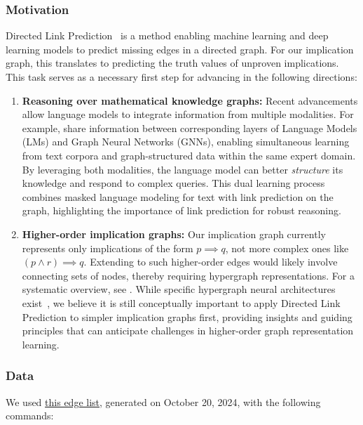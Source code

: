 \subsubsection{Motivation}

Directed Link Prediction~\cite{Kipf2016} is a method enabling machine learning and deep learning
models to predict missing edges in a directed graph. For our implication graph, this translates to
predicting the truth values of unproven implications. This task serves as a necessary first step
for advancing in the following directions:

\begin{enumerate}
    \item \textbf{Reasoning over mathematical knowledge graphs:} Recent advancements allow language
    models to integrate information from multiple modalities. For example,
    \cite{Zhang2022, Yasunaga2022} share information between corresponding layers of Language Models (LMs)
    and Graph Neural Networks (GNNs), enabling simultaneous learning from text corpora and graph-structured
    data within the same expert domain. By leveraging both modalities, the language model can better
    \emph{structure} its knowledge and respond to complex queries. This dual learning process combines
    masked language modeling for text with link prediction on the graph, highlighting the importance
    of link prediction for robust reasoning.
    \item \textbf{Higher-order implication graphs:} Our implication graph currently represents only
    implications of the form $p \implies q$, not more complex ones like $(p \land r) \implies q$.
    Extending to such higher-order edges would likely involve connecting sets of nodes, thereby
    requiring hypergraph representations. For a systematic overview, see \cite{Kivela2014}.
    While specific hypergraph neural architectures exist~\cite{Feng2019}, we believe it is still
    conceptually important to apply Directed Link Prediction to simpler implication graphs first,
    providing insights and guiding principles that can anticipate challenges in higher-order graph
    representation learning.
\end{enumerate}

\subsubsection{Data}

We used \href{https://github.com/teorth/equational_theories/blob/main/data/2024-10-20-edge_list.csv.zip}{this edge list},
generated on October 20, 2024, with the following commands:

